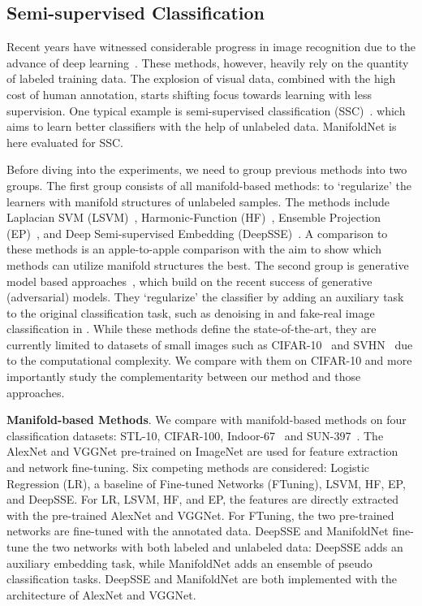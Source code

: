 \documentclass{bmvc2k}
\begin{document}
  
\subsection{Semi-supervised Classification}
Recent years have witnessed considerable progress in image recognition
due to the advance of deep
learning~\cite{deepnet:nips12,vgg16,resnet}. These methods, however,
heavily rely on the quantity of labeled training data. The
explosion of visual data, combined with the high cost of human
annotation, starts shifting focus towards learning with less supervision. One typical
example is semi-supervised classification (SSC)~\cite{Weston:2008,dai:EnPro:iccv13, kingma2014semi, springenberg2015unsupervised, ladder:network, distributional:smoothing, improved:GAN, hoffer2016semi}. which aims to learn better classifiers with the help of unlabeled
data. ManifoldNet is here evaluated for SSC. 

Before diving into the experiments, we need to group previous methods into two groups. The first group consists of all manifold-based methods: to `regularize' the learners with  manifold structures of unlabeled samples. The methods include Laplacian SVM (LSVM)~\cite{LapSVM}, Harmonic-Function 
(HF)~\cite{Zhu:Harmonic:03}, Ensemble Projection
(EP)~\cite{dai:EnPro:iccv13}, and Deep Semi-supervised Embedding
(DeepSSE)~\cite{Weston:2008}. A comparison to these methods is an apple-to-apple comparison with the aim to show which methods can utilize manifold structures the best. 
The second group is generative model based approaches~\cite{kingma2014semi, springenberg2015unsupervised, ladder:network, distributional:smoothing, improved:GAN}, which build on the recent success of generative (adversarial) models. They `regularize' the classifier by adding an auxiliary task to the original classification task, such as denoising in \cite{ladder:network} and fake-real image classification in \cite{improved:GAN}. While these methods define the state-of-the-art, they are currently limited to datasets of small images such as CIFAR-10~\cite{cifar} and SVHN~\cite{svhn} due to the computational complexity. We compare with them on CIFAR-10 and more importantly study the complementarity between our method and those approaches. 

\noindent
\textbf{Manifold-based Methods}. We compare with manifold-based methods on four classification datasets:  STL-10, CIFAR-100, Indoor-67~\cite{Indoor} and SUN-397~\cite{SUN397}.  
The AlexNet and VGGNet pre-trained on ImageNet are used for feature extraction and network
fine-tuning. Six competing methods are considered: Logistic Regression
(LR), a baseline of Fine-tuned Networks
(FTuning), LSVM, HF, EP, and DeepSSE. For LR, LSVM, HF, and EP, the features are directly
extracted with the pre-trained AlexNet and VGGNet. For FTuning, the
two pre-trained networks are fine-tuned with the annotated
data. DeepSSE and ManifoldNet fine-tune the two networks with both
labeled and unlabeled data: DeepSSE adds an auxiliary embedding task,
while ManifoldNet adds an ensemble of pseudo classification
tasks. DeepSSE and ManifoldNet are both implemented with the
architecture of AlexNet and VGGNet.
\end{document}
